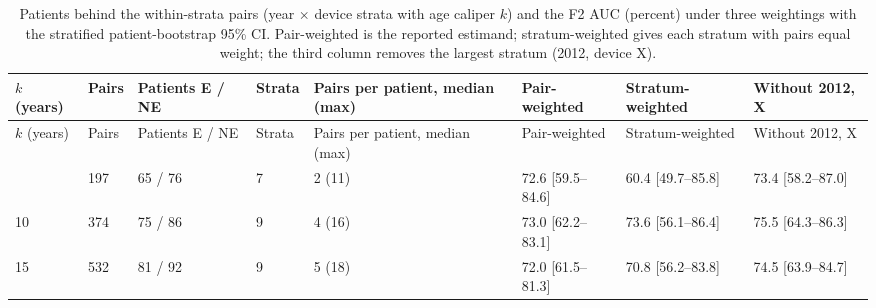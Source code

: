 {\scriptsize
\setlength{\tabcolsep}{2.5pt}
\begin{longtable}{p{}p{}p{}p{}p{}p{}p{}p{}}
\caption{Patients behind the within-strata pairs (year $\times$ device strata with age caliper $k$) and the F2 AUC (percent) under three weightings with the stratified patient-bootstrap 95\% CI. Pair-weighted is the reported estimand; stratum-weighted gives each stratum with pairs equal weight; the third column removes the largest stratum (2012, device X).}\label{tab:s2_kontributor}\\
\toprule
$k$ (years) & Pairs & Patients E / NE & Strata & Pairs per patient, median (max) & Pair-weighted & Stratum-weighted & Without 2012, X \\
\midrule
\endfirsthead
\toprule
$k$ (years) & Pairs & Patients E / NE & Strata & Pairs per patient, median (max) & Pair-weighted & Stratum-weighted & Without 2012, X \\
\midrule
\endhead
\bottomrule
\endfoot
5 & 197 & 65 / 76 & 7 & 2 (11) & 72.6 [59.5--84.6] & 60.4 [49.7--85.8] & 73.4 [58.2--87.0] \\
10 & 374 & 75 / 86 & 9 & 4 (16) & 73.0 [62.2--83.1] & 73.6 [56.1--86.4] & 75.5 [64.3--86.3] \\
15 & 532 & 81 / 92 & 9 & 5 (18) & 72.0 [61.5--81.3] & 70.8 [56.2--83.8] & 74.5 [63.9--84.7] \\
\end{longtable}
}
